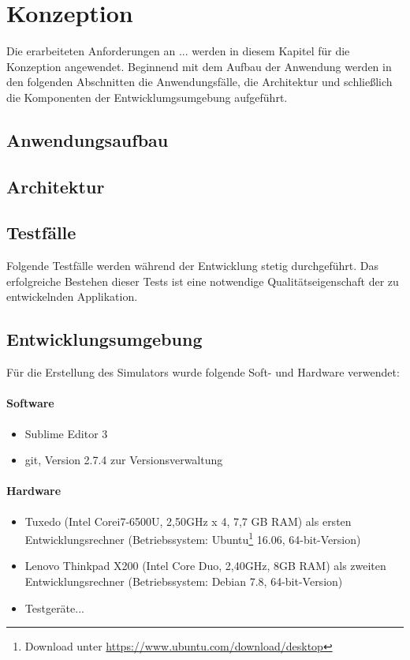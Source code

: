 \chapter{\label{chap:konzeption}Konzeption}
Die erarbeiteten Anforderungen an ... werden in diesem Kapitel für die Konzeption angewendet.
Beginnend mit dem Aufbau der Anwendung werden in den folgenden Abschnitten die Anwendungsfälle,
die Architektur und schließlich die Komponenten der Entwicklumgsumgebung aufgeführt.
%
%
\section{Anwendungsaufbau}
%
%
\section{Architektur}
%
%
\section{Testfälle}
Folgende Testfälle werden während der Entwicklung stetig durchgeführt. Das erfolgreiche Bestehen dieser Tests ist eine notwendige Qualitätseigenschaft der zu entwickelnden Applikation.
%
%
\section{Entwicklungsumgebung}
Für die Erstellung des Simulators wurde folgende Soft- und Hardware verwendet:
\subsubsection{Software}
\begin{itemize}
  \item Sublime Editor 3
  \item git, Version 2.7.4 zur Versionsverwaltung
\end{itemize}
\subsubsection{Hardware}
\begin{itemize}
  \item Tuxedo (Intel\textsuperscript{\textregistered} Core\texttrademark i7-6500U, 2,50GHz x 4, 7,7 GB RAM) als ersten Entwicklungsrechner
        (Betriebssystem: Ubuntu\footnote{ Download unter \url{https://www.ubuntu.com/download/desktop}} 16.06, 64-bit-Version)
  \item Lenovo Thinkpad X200 (Intel\textsuperscript{\textregistered} Core Duo, 2,40GHz, 8GB RAM) als zweiten Entwicklungsrechner (Betriebssystem: Debian 7.8, 64-bit-Version)
  \item Testgeräte...
\end{itemize}
